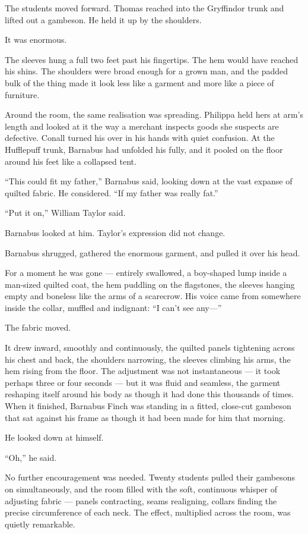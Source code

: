 The students moved forward. Thomas reached into the Gryffindor trunk and lifted out a gambeson. He held it up by the shoulders.
 
It was enormous.
 
The sleeves hung a full two feet past his fingertips. The hem would have reached his shins. The shoulders were broad enough for a grown man, and the padded bulk of the thing made it look less like a garment and more like a piece of furniture.
 
Around the room, the same realisation was spreading. Philippa held hers at arm's length and looked at it the way a merchant inspects goods she suspects are defective. Conall turned his over in his hands with quiet confusion. At the Hufflepuff trunk, Barnabus had unfolded his fully, and it pooled on the floor around his feet like a collapsed tent.
 
\enquote{This could fit my father,} Barnabus said, looking down at the vast expanse of quilted fabric. He considered. \enquote{If my father was really fat.}
 
\enquote{Put it on,} William Taylor said.
 
Barnabus looked at him. Taylor's expression did not change.
 
Barnabus shrugged, gathered the enormous garment, and pulled it over his head.
 
For a moment he was gone --- entirely swallowed, a boy-shaped lump inside a man-sized quilted coat, the hem puddling on the flagstones, the sleeves hanging empty and boneless like the arms of a scarecrow. His voice came from somewhere inside the collar, muffled and indignant: \enquote{I can't see any---}
 
The fabric moved.
 
It drew inward, smoothly and continuously, the quilted panels tightening across his chest and back, the shoulders narrowing, the sleeves climbing his arms, the hem rising from the floor. The adjustment was not instantaneous --- it took perhaps three or four seconds --- but it was fluid and seamless, the garment reshaping itself around his body as though it had done this thousands of times. When it finished, Barnabus Finch was standing in a fitted, close-cut gambeson that sat against his frame as though it had been made for him that morning.
 
He looked down at himself.
 
\enquote{Oh,} he said.
 
No further encouragement was needed. Twenty students pulled their gambesons on simultaneously, and the room filled with the soft, continuous whisper of adjusting fabric --- panels contracting, seams realigning, collars finding the precise circumference of each neck. The effect, multiplied across the room, was quietly remarkable.
 
